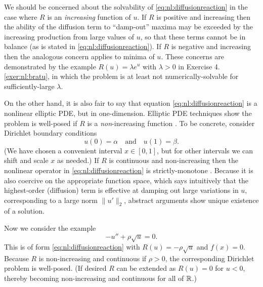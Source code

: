 We should be concerned about the solvability of \eqref{eq:nl:diffusionreaction} in the case where $R$ is an \emph{increasing} function of $u$.  If $R$ is positive and increasing then the ability of the diffusion term to ``damp-out'' maxima may be exceeded by the increasing production from large values of $u$, so that these terms cannot be in balance (as is stated in \eqref{eq:nl:diffusionreaction}).  If $R$ is negative and increasing then the analogous concern applies to minima of $u$.  These concerns are demonstrated by the example $R(u) = \lambda e^u$ with $\lambda>0$ in Exercise 4.\ref{exer:nl:bratu}, in which the problem is at least not numerically-solvable for sufficiently-large $\lambda$.  

On the other hand, it is also fair to say that equation \eqref{eq:nl:diffusionreaction} is a nonlinear elliptic PDE, but in one-dimension.  Elliptic PDE techniques show the problem is well-posed if $R$ is a \emph{non}-increasing function \citep[pages 93-94]{KinderlehrerStampacchia1980}.  To be concrete, consider Dirichlet boundary conditions
\begin{equation}
u(0)=\alpha \quad \text{and} \quad u(1)=\beta.  \label{eq:nl:drbcs}
\end{equation}
(We have chosen a convenient interval $x\in[0,1]$, but for other intervals we can shift and scale $x$ as needed.)  If $R$ is continuous and non-increasing then the nonlinear operator in \eqref{eq:nl:diffusionreaction} is strictly-monotone \citep{KinderlehrerStampacchia1980}.  Because it is also coercive on the appropriate function space, which says intuitively that the highest-order (diffusion) term is effective at damping out large variations in $u$, corresponding to a large norm $\|u'\|_2$, abstract arguments show unique existence of a solution.

Now we consider the example
\begin{equation}
-u'' + \rho \sqrt{u} = 0. \label{eq:nl:drsqrt}
\end{equation}
This is of form \eqref{eq:nl:diffusionreaction} with $R(u) = - \rho \sqrt{u}$ and $f(x)=0$.  Because $R$ is non-increasing and continuous if $\rho>0$, the corresponding Dirichlet problem is well-posed.  (If desired $R$ can be extended as $R(u)=0$ for $u<0$, thereby becoming non-increasing and continuous for all of $\mathbb{R}$.)

